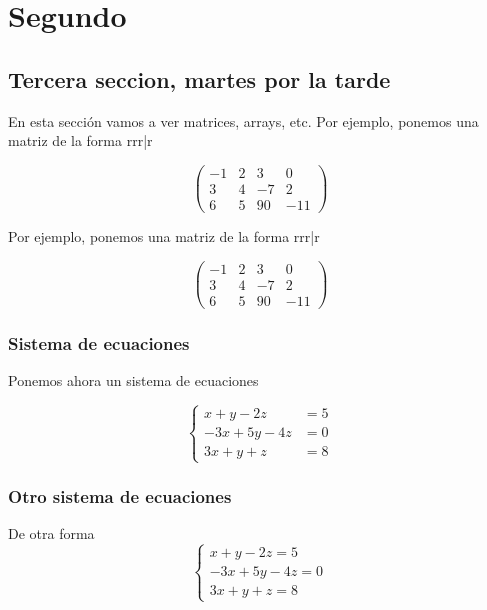 \chapter{Segundo}

\section[Martes tarde]{Tercera seccion, martes por la tarde}
En esta sección vamos a ver matrices, arrays, etc.
Por ejemplo, ponemos una matriz de la forma rrr|r

\[
\left (
\begin{array}{rrr|r} 
	-1 & 2 &  3 &   0 \\ 
	3 & 4 & -7 &   2\\
	6 & 5 & 90 & -11
\end{array} 
\right )
\]

\begin{minipage}{.8\textwidth} \color{blue}
	Por ejemplo, ponemos una matriz de la forma rrr|r
	
	\[
	\left (
	\begin{array}{rrr|r} 
		-1 & 2 &  3 &   0 \\ 
		3 & 4 & -7 &   2\\
		6 & 5 & 90 & -11
	\end{array} 
	\right )
	\]
\end{minipage}

\subsection{Sistema de ecuaciones}
Ponemos ahora un sistema de ecuaciones

\[
\left \{
\begin{array}{rr} 
	x+y-2z & = 5 \\
	-3x+5y-4z & = 0 \\
	3x+y+z & = 8
\end{array}
\right .
\]

\subsection{Otro sistema de ecuaciones}
De otra forma
\[
\left \{
\begin{array}{r}
	x+y-2z  = 5 \\
	-3x+5y-4z  = 0 \\
	3x+y+z = 8
\end{array}
\right .
\]

